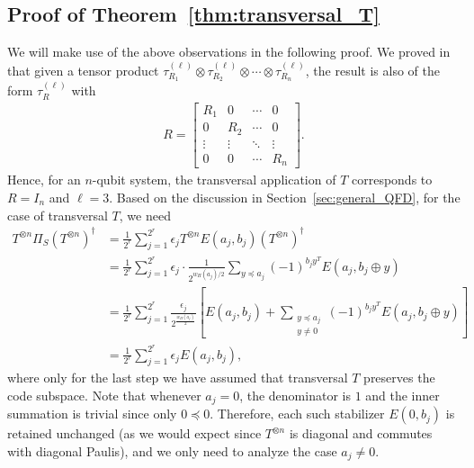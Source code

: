 \documentclass[twoside,romanappendices]{IEEEtran}
\begin{document}
\subsection{Proof of Theorem~\ref{thm:transversal_T}}
\label{sec:proof_transversal_T}


We will make use of the above observations in the following proof.
We proved in~\cite{Rengaswamy-pra19} that given a tensor product $\tau_{R_1}^{(\ell)} \otimes \tau_{R_2}^{(\ell)} \otimes \cdots \otimes \tau_{R_n}^{(\ell)}$, the result is also of the form $\tau_R^{(\ell)}$ with 
\begin{align}
R = 
\begin{bmatrix}
R_1 & 0 & \cdots & 0 \\
0 & R_2 & \cdots & 0 \\
\vdots & \vdots & \ddots & \vdots \\
0 & 0 & \cdots & R_n 
\end{bmatrix}.
\end{align}
Hence, for an $n$-qubit system, the transversal application of $T$ corresponds to $R = I_n$ and $\ell = 3$.
Based on the discussion in Section~\ref{sec:general_QFD}, for the case of transversal $T$, we need
\begin{align}
T^{\otimes n} \Pi_S (T^{\otimes n})^{\dagger} & = \frac{1}{2^r} \sum_{j = 1}^{2^r} \epsilon_j T^{\otimes n} E(a_j,b_j) (T^{\otimes n})^{\dagger} \\
%
  & = \frac{1}{2^r} \sum_{j = 1}^{2^r} \epsilon_j \cdot \frac{1}{2^{w_H(a_j)/2}} \sum_{y \preceq a_j} (-1)^{b_j y^T} E(a_j, b_j \oplus y) \\
%
  & = \frac{1}{2^r} \sum_{j = 1}^{2^r} \frac{\epsilon_j}{2^{\frac{w_H(a_j)}{2}}} \left[ E(a_j, b_j) + \sum_{\substack{y \preceq a_j\\y \neq 0}} (-1)^{b_j y^T} E(a_j, b_j \oplus y) \right] \\
%
\label{eq:transT_equality}
  & = \frac{1}{2^r} \sum_{j = 1}^{2^r} \epsilon_j E(a_j,b_j),
\end{align}
where only for the last step we have assumed that transversal $T$ preserves the code subspace.
Note that whenever $a_j = 0$, the denominator is $1$ and the inner summation is trivial since only $0 \preceq 0$.
Therefore, each such stabilizer $E(0,b_j)$ is retained unchanged (as we would expect since $T^{\otimes n}$ is diagonal and commutes with diagonal Paulis), and we only need to analyze the case $a_j \neq 0$.
\end{document}
